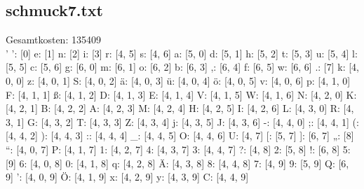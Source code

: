 \documentclass[a4paper,10pt,ngerman]{scrartcl}
\begin{document}
\subsection{schmuck7.txt}
Gesamtkosten: 135409\\
' ': [0]
e: [1]
n: [2]
i: [3]
r: [4, 5]
s: [4, 6]
a: [5, 0]
d: [5, 1]
h: [5, 2]
t: [5, 3]
u: [5, 4]
l: [5, 5]
c: [5, 6]
g: [6, 0]
m: [6, 1]
o: [6, 2]
b: [6, 3]
,: [6, 4]
f: [6, 5]
w: [6, 6]
.: [7]
k: [4, 0, 0]
z: [4, 0, 1]
S: [4, 0, 2]
ä: [4, 0, 3]
ü: [4, 0, 4]
ö: [4, 0, 5]
v: [4, 0, 6]
p: [4, 1, 0]
F: [4, 1, 1]
ß: [4, 1, 2]
D: [4, 1, 3]
E: [4, 1, 4]
V: [4, 1, 5]
W: [4, 1, 6]
N: [4, 2, 0]
K: [4, 2, 1]
B: [4, 2, 2]
A: [4, 2, 3]
M: [4, 2, 4]
H: [4, 2, 5]
I: [4, 2, 6]
L: [4, 3, 0]
R: [4, 3, 1]
G: [4, 3, 2]
T: [4, 3, 3]
Z: [4, 3, 4]
j: [4, 3, 5]
J: [4, 3, 6]
-: [4, 4, 0]
;: [4, 4, 1]
(: [4, 4, 2]
): [4, 4, 3]
:: [4, 4, 4]
\_: [4, 4, 5]
O: [4, 4, 6]
U: [4, 7]
[: [5, 7]
]: [6, 7]
„: [8]
“: [4, 0, 7]
P: [4, 1, 7]
1: [4, 2, 7]
4: [4, 3, 7]
3: [4, 4, 7]
?: [4, 8]
2: [5, 8]
!: [6, 8]
5: [9]
6: [4, 0, 8]
0: [4, 1, 8]
q: [4, 2, 8]
Ä: [4, 3, 8]
8: [4, 4, 8]
7: [4, 9]
9: [5, 9]
Q: [6, 9]
’: [4, 0, 9]
Ö: [4, 1, 9]
x: [4, 2, 9]
y: [4, 3, 9]
C: [4, 4, 9]
\end{document}
